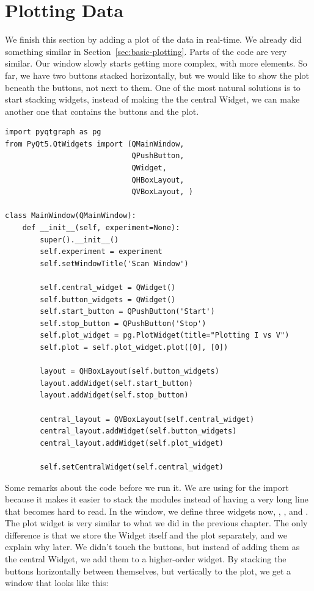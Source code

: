 

\section{Plotting Data}\label{sec:plotting-data}
We finish this section by adding a plot of the data in real-time. We already did something similar in Section~\ref{sec:basic-plotting}. Parts of the code are very similar. Our window slowly starts getting more complex, with more elements. So far, we have two buttons stacked horizontally, but we would like to show the plot beneath the buttons, not next to them. One of the most natural solutions is to start stacking widgets, instead of making the  the central Widget, we can make another one that contains the buttons and the plot.

\begin{verbatim}
import pyqtgraph as pg
from PyQt5.QtWidgets import (QMainWindow,
                             QPushButton,
                             QWidget,
                             QHBoxLayout,
                             QVBoxLayout, )

class MainWindow(QMainWindow):
    def __init__(self, experiment=None):
        super().__init__()
        self.experiment = experiment
        self.setWindowTitle('Scan Window')

        self.central_widget = QWidget()
        self.button_widgets = QWidget()
        self.start_button = QPushButton('Start')
        self.stop_button = QPushButton('Stop')
        self.plot_widget = pg.PlotWidget(title="Plotting I vs V")
        self.plot = self.plot_widget.plot([0], [0])

        layout = QHBoxLayout(self.button_widgets)
        layout.addWidget(self.start_button)
        layout.addWidget(self.stop_button)

        central_layout = QVBoxLayout(self.central_widget)
        central_layout.addWidget(self.button_widgets)
        central_layout.addWidget(self.plot_widget)

        self.setCentralWidget(self.central_widget)
\end{verbatim}

Some remarks about the code before we run it. We are using \py{()} for the import because it makes it easier to stack the modules instead of having a very long line that becomes hard to read. In the window, we define three widgets now, , , and . The plot widget is very similar to what we did in the previous chapter. The only difference is that we store the Widget itself and the plot separately, and we explain why later. We didn't touch the buttons, but instead of adding them as the central Widget, we add them to a higher-order widget. By stacking the buttons horizontally between themselves, but vertically to the plot, we get a window that looks like this:

